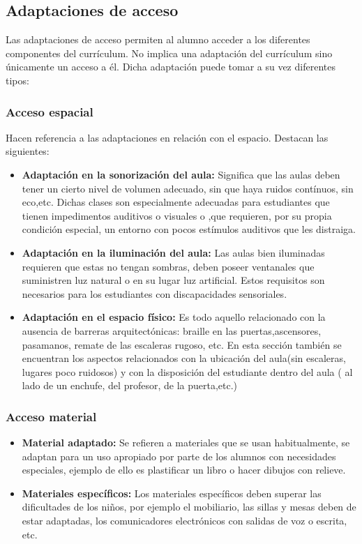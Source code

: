 \subsection{Adaptaciones de acceso}
Las adaptaciones de acceso permiten al alumno acceder a los diferentes componentes del currículum. No implica una adaptación del currículum sino únicamente un acceso a él. 
Dicha adaptación puede tomar a su vez diferentes tipos:

\subsubsection{Acceso espacial}
Hacen referencia a las adaptaciones en relación con el espacio. Destacan las siguientes:
\begin{itemize}
    \item \textbf{Adaptación en la sonorización del aula:} Significa que las aulas deben tener un cierto nivel de volumen adecuado, sin que haya ruidos contínuos, sin eco,etc. Dichas clases son especialmente adecuadas para estudiantes que tienen impedimentos auditivos o visuales o ,que requieren, por su propia condición especial, un entorno con pocos estímulos auditivos que les distraiga.
    \item \textbf{Adaptación en la iluminación del aula:} Las aulas bien iluminadas requieren que estas no tengan sombras, deben poseer ventanales que suministren luz natural o en su lugar luz artificial. Estos requisitos son necesarios para los estudiantes con discapacidades sensoriales.
    \item \textbf{Adaptación en el espacio físico:} Es todo aquello relacionado con la ausencia de barreras arquitectónicas:  braille en las puertas,ascensores, pasamanos, remate de las escaleras rugoso, etc. En esta sección también se encuentran los aspectos relacionados con la ubicación del aula(sin escaleras, lugares poco ruidosos) y con la disposición del estudiante dentro del aula ( al lado de un enchufe, del profesor, de la puerta,etc.)
\end{itemize}

\subsubsection{Acceso material}
\begin{itemize}
    \item \textbf{Material adaptado:} Se refieren a materiales que se usan habitualmente, se adaptan para un uso apropiado por parte de los alumnos con necesidades especiales, ejemplo de ello es plastificar un libro o hacer dibujos con relieve.
    \item \textbf{Materiales específicos:} Los materiales específicos deben superar las dificultades de los niños, por ejemplo el mobiliario, las sillas y mesas deben de estar adaptadas, los comunicadores electrónicos con salidas de voz o escrita, etc.
\end{itemize}


